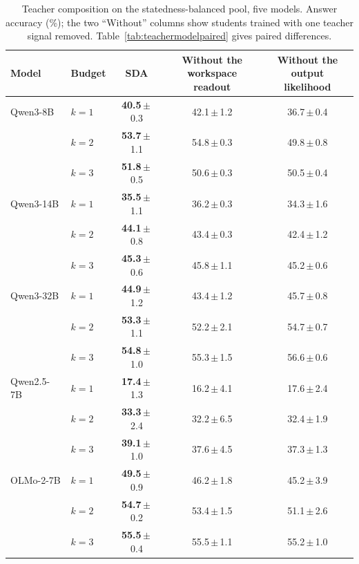 \begin{table}[t]
\centering
\caption{Teacher composition on the statedness-balanced pool, five models. Answer accuracy (\%); the two ``Without'' columns show
students trained with one teacher signal removed. Table~\ref{tab:teachermodelpaired} gives paired
differences.}
\label{tab:teachermodels}
\small
\setlength{\tabcolsep}{4pt}
\begin{tabular}{llccc}
\toprule
Model & Budget & \textbf{SDA} & \shortstack{Without the\\workspace readout} & \shortstack{Without the\\output likelihood} \\
\midrule
Qwen3-8B & $k=1$ & \textbf{40.5}\,$\pm$\,0.3 & 42.1\,$\pm$\,1.2 & 36.7\,$\pm$\,0.4 \\
 & $k=2$ & \textbf{53.7}\,$\pm$\,1.1 & 54.8\,$\pm$\,0.3 & 49.8\,$\pm$\,0.8 \\
 & $k=3$ & \textbf{51.8}\,$\pm$\,0.5 & 50.6\,$\pm$\,0.3 & 50.5\,$\pm$\,0.4 \\
\addlinespace
Qwen3-14B & $k=1$ & \textbf{35.5}\,$\pm$\,1.1 & 36.2\,$\pm$\,0.3 & 34.3\,$\pm$\,1.6 \\
 & $k=2$ & \textbf{44.1}\,$\pm$\,0.8 & 43.4\,$\pm$\,0.3 & 42.4\,$\pm$\,1.2 \\
 & $k=3$ & \textbf{45.3}\,$\pm$\,0.6 & 45.8\,$\pm$\,1.1 & 45.2\,$\pm$\,0.6 \\
\addlinespace
Qwen3-32B & $k=1$ & \textbf{44.9}\,$\pm$\,1.2 & 43.4\,$\pm$\,1.2 & 45.7\,$\pm$\,0.8 \\
 & $k=2$ & \textbf{53.3}\,$\pm$\,1.1 & 52.2\,$\pm$\,2.1 & 54.7\,$\pm$\,0.7 \\
 & $k=3$ & \textbf{54.8}\,$\pm$\,1.0 & 55.3\,$\pm$\,1.5 & 56.6\,$\pm$\,0.6 \\
\addlinespace
Qwen2.5-7B & $k=1$ & \textbf{17.4}\,$\pm$\,1.3 & 16.2\,$\pm$\,4.1 & 17.6\,$\pm$\,2.4 \\
 & $k=2$ & \textbf{33.3}\,$\pm$\,2.4 & 32.2\,$\pm$\,6.5 & 32.4\,$\pm$\,1.9 \\
 & $k=3$ & \textbf{39.1}\,$\pm$\,1.0 & 37.6\,$\pm$\,4.5 & 37.3\,$\pm$\,1.3 \\
\addlinespace
OLMo-2-7B & $k=1$ & \textbf{49.5}\,$\pm$\,0.9 & 46.2\,$\pm$\,1.8 & 45.2\,$\pm$\,3.9 \\
 & $k=2$ & \textbf{54.7}\,$\pm$\,0.2 & 53.4\,$\pm$\,1.5 & 51.1\,$\pm$\,2.6 \\
 & $k=3$ & \textbf{55.5}\,$\pm$\,0.4 & 55.5\,$\pm$\,1.1 & 55.2\,$\pm$\,1.0 \\
\bottomrule
\end{tabular}
\end{table}
